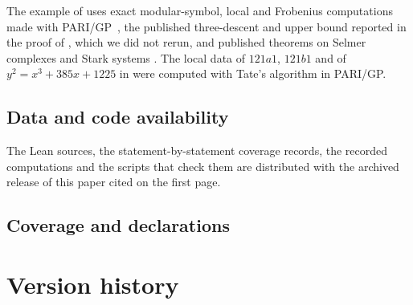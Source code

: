 The example of  uses exact modular-symbol, local and
Frobenius computations made with PARI/GP~\citep{PARI2023}, the published
three-descent and upper bound reported in the proof of
\citet[Theorem~7.2]{Miller2011}, which we did not rerun, and published
theorems on Selmer complexes and Stark systems
\citep{Sakamoto2018,MaciasCastilloSano2026}.  The local data of $121a1$,
$121b1$ and of $y^2=x^3+385x+1225$ in  were
computed with Tate's algorithm in PARI/GP.

\subsection*{Data and code availability}

The Lean sources, the statement-by-statement coverage records, the
recorded computations and the scripts that check them are distributed
with the archived release of this paper cited on the first page.

\subsection*{Coverage and declarations}





\section{Version history}\label{app:version-history}

